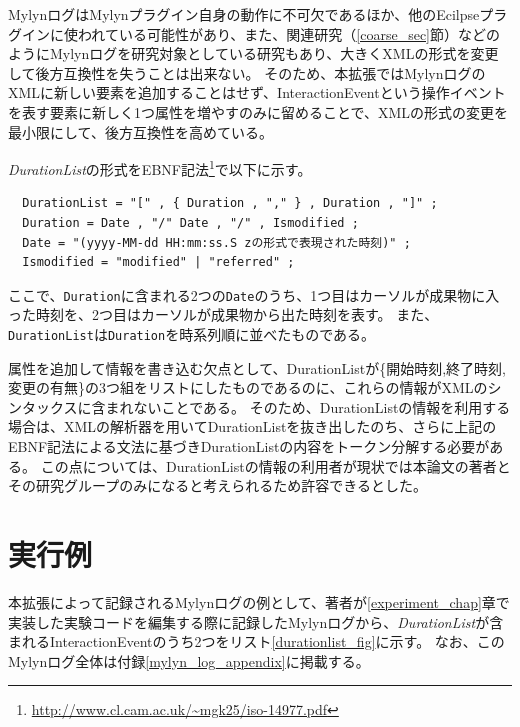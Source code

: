 \documentclass[a4paper]{jsbook}
\begin{document}
MylynログはMylynプラグイン自身の動作に不可欠であるほか、他のEcilpseプラグインに使われている可能性があり、また、関連研究（\ref{coarse_sec}節）などのようにMylynログを研究対象としている研究もあり、大きくXMLの形式を変更して後方互換性を失うことは出来ない。
そのため、本拡張ではMylynログのXMLに新しい要素を追加することはせず、InteractionEventという操作イベントを表す要素に新しく1つ属性を増やすのみに留めることで、XMLの形式の変更を最小限にして、後方互換性を高めている。

{\it DurationList}の形式をEBNF記法\footnote{\url{http://www.cl.cam.ac.uk/~mgk25/iso-14977.pdf}}で以下に示す。
\begin{verbatim}
  DurationList = "[" , { Duration , "," } , Duration , "]" ;
  Duration = Date , "/" Date , "/" , Ismodified ;
  Date = "(yyyy-MM-dd HH:mm:ss.S zの形式で表現された時刻)" ;
  Ismodified = "modified" | "referred" ;
\end{verbatim}
ここで、\texttt{Duration}に含まれる2つの\texttt{Date}のうち、1つ目はカーソルが成果物に入った時刻を、2つ目はカーソルが成果物から出た時刻を表す。
また、\texttt{DurationList}は\texttt{Duration}を時系列順に並べたものである。


属性を追加して情報を書き込む欠点として、DurationListが\{開始時刻,終了時刻,変更の有無\}の3つ組をリストにしたものであるのに、これらの情報がXMLのシンタックスに含まれないことである。
そのため、DurationListの情報を利用する場合は、XMLの解析器を用いてDurationListを抜き出したのち、さらに上記のEBNF記法による文法に基づきDurationListの内容をトークン分解する必要がある。
この点については、DurationListの情報の利用者が現状では本論文の著者とその研究グループのみになると考えられるため許容できるとした。

\section{実行例}
本拡張によって記録されるMylynログの例として、著者が\ref{experiment_chap}章で実装した実験コードを編集する際に記録したMylynログから、{\it DurationList}が含まれるInteractionEventのうち2つをリスト\ref{durationlist_fig}に示す。
なお、このMylynログ全体は付録\ref{mylyn_log_appendix}に掲載する。
\end{document}
